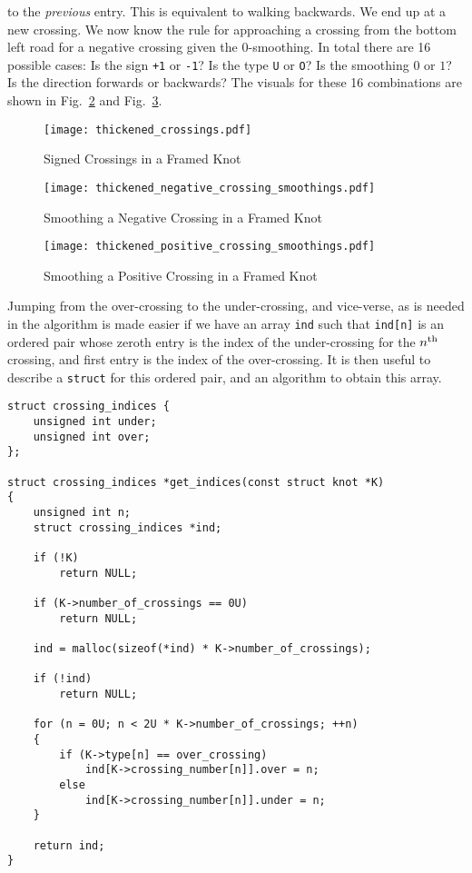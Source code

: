         to the \textit{previous} entry.
        This is equivalent to walking backwards. We end up at a new crossing.
        We now know the rule for approaching a crossing from the bottom left
        road for a negative crossing given the 0-smoothing. In total there are
        16 possible cases: Is the sign \texttt{+1} or \texttt{-1}? Is the type
        \texttt{U} or \texttt{O}? Is the smoothing $0$ or $1$?
        Is the direction forwards or backwards? The
        visuals for these 16 combinations are shown in
        Fig.~\ref{fig:thickened_negative_crossing_smoothings} and
        Fig.~\ref{fig:thickened_positive_crossing_smoothings}.
        \par\hfill\par
        \begin{figure}
            \centering
            \texttt{[image: thickened\_crossings.pdf]}
            \caption{Signed Crossings in a Framed Knot}
            \label{fig:thickened_crossings}
        \end{figure}
        \begin{figure}
            \centering
            \texttt{[image: thickened\_negative\_crossing\_smoothings.pdf]}
            \caption{Smoothing a Negative Crossing in a Framed Knot}
            \label{fig:thickened_negative_crossing_smoothings}
        \end{figure}
        \begin{figure}
            \centering
            \texttt{[image: thickened\_positive\_crossing\_smoothings.pdf]}
            \caption{Smoothing a Positive Crossing in a Framed Knot}
            \label{fig:thickened_positive_crossing_smoothings}
        \end{figure}
        Jumping from the over-crossing to the under-crossing, and vice-verse,
        as is needed in the algorithm is made easier if we have an array
        \texttt{ind} such that \texttt{ind[n]} is an ordered pair whose
        zeroth entry is the index of the under-crossing for the
        $n^{\small\textrm{th}}$ crossing, and first entry is the index of the
        over-crossing. It is then
        useful to describe a \texttt{struct} for this ordered pair, and an
        algorithm to obtain this array.
\begin{lstlisting}[style=CStyle]
struct crossing_indices {
    unsigned int under;
    unsigned int over;
};

struct crossing_indices *get_indices(const struct knot *K)
{
    unsigned int n;
    struct crossing_indices *ind;

    if (!K)
        return NULL;

    if (K->number_of_crossings == 0U)
        return NULL;

    ind = malloc(sizeof(*ind) * K->number_of_crossings);

    if (!ind)
        return NULL;

    for (n = 0U; n < 2U * K->number_of_crossings; ++n)
    {
        if (K->type[n] == over_crossing)
            ind[K->crossing_number[n]].over = n;
        else
            ind[K->crossing_number[n]].under = n;
    }

    return ind;
}
\end{lstlisting}
